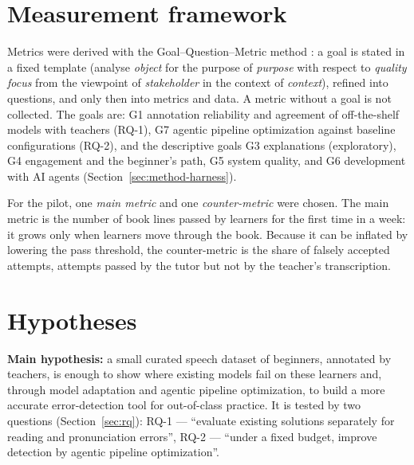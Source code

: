 \section{Measurement framework}\label{sec:method-gqm}

Metrics were derived with the Goal--Question--Metric method \cite{SRC-048}: a goal is stated in a fixed
template (analyse \emph{object} for the purpose of \emph{purpose} with respect to \emph{quality focus} from
the viewpoint of \emph{stakeholder} in the context of \emph{context}), refined into questions, and only then
into metrics and data. A metric without a goal is not collected. The goals are: G1 annotation
reliability and agreement of off-the-shelf models with teachers (RQ-1), G7 agentic pipeline optimization against baseline configurations (RQ-2), and the descriptive goals G3 explanations (exploratory), G4 engagement and the
beginner's path, G5 system quality, and G6 development with AI agents (Section~\ref{sec:method-harness}).

For the pilot, one \emph{main metric} and one \emph{counter-metric} were chosen. The main metric is the
number of book lines passed by learners for the first time in a week: it grows only when learners move
through the book. Because it can be inflated by lowering the pass threshold, the counter-metric is the
share of falsely accepted attempts, attempts passed by the tutor but not by the teacher's transcription.

\section{Hypotheses}\label{sec:method-hyp}

\textbf{Main hypothesis:} a small curated speech dataset of beginners, annotated by teachers, is enough to show where existing models fail on these learners and, through model adaptation and agentic pipeline optimization, to build a more accurate error-detection tool for out-of-class practice. It is tested by two questions (Section~\ref{sec:rq}): RQ-1 --- ``evaluate existing solutions separately for reading and pronunciation errors'', RQ-2 --- ``under a fixed budget, improve detection by agentic pipeline optimization''.

